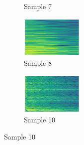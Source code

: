 \begin{figure}[H]
{\begin{subfigure}{0.24\textwidth}
{{        }\hspace*{0.75cm}%
      }%
      \caption*{Sample 7}
    \end{subfigure}
    \begin{subfigure}{0.24\textwidth}
      \includegraphics[width=3cm]{titletune/buttons/samples/tune13.mod-8.wav-spec.png}%
      \caption*{Sample 8}
    \end{subfigure}
    \begin{subfigure}{0.24\textwidth}
      \includegraphics[width=3cm]{titletune/buttons/samples/tune13.mod-10.wav-spec.png}%
      \caption*{Sample 10}
    \end{subfigure}
}
\end{figure}
\clearpage

